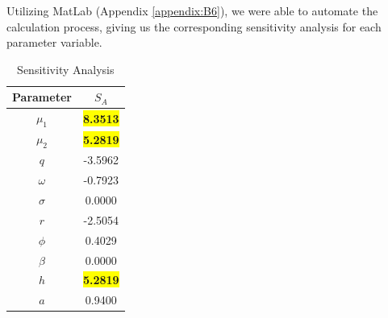 \documentclass[12pt]{article}
\begin{document}
Utilizing MatLab (Appendix \ref{appendix:B6}), we were able to automate the calculation process, giving us the corresponding sensitivity analysis for each parameter variable. 
\begin{table}[H]
        \centering
        \begin{tabular}{|c|c|}
            \hline
            Parameter & $S_{A}$ \\
            \hline
            \hline
            $\mu_{1}$ & \colorbox{yellow}{\textbf{8.3513}}\\
            \hline
            $\mu_{2}$ & \colorbox{yellow}{\textbf{5.2819}}\\
            \hline
            $q$ & -3.5962\\
            \hline
            $\omega$ & -0.7923\\
            \hline
            $\sigma$ & 0.0000\\
            \hline
            $r$ & -2.5054\\
            \hline
            $\phi$ & 0.4029\\
            \hline
            $\beta$ & 0.0000\\
            \hline
            $h$ & \colorbox{yellow}{\textbf{5.2819}}\\
            \hline
            $a$ & 0.9400\\
            \hline
        \end{tabular}
        \caption{Sensitivity Analysis}
        \label{tab:sens_analysis}
    \end{table}
    
\end{document}
